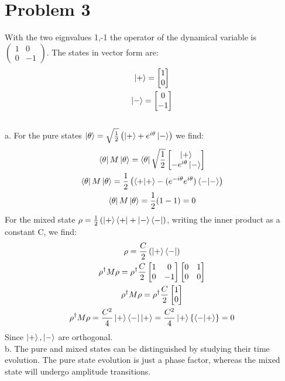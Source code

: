 \documentclass[a4paper,12pt]{article}
\numberwithin{equation}{section}
\begin{document}
\section{Problem 3}
With the two eignvalues 1,-1 the operator of the dynamical variable is $\left(\begin{smallmatrix}1&0\\0&-1\end{smallmatrix}\right)$.
The states in vector form are:
\begin{gather}
 \ket{+}=\begin{bmatrix}1\\0 \end{bmatrix}\\
 \ket{-}=\begin{bmatrix}0\\-1 \end{bmatrix}
\end{gather}
\\
a. For the pure states $\ket{\theta}=\sqrt{\frac{1}{2}}\left(\ket{+}+e^{i\theta}\ket{-}  \right)$ we find:
\begin{gather}
 \bra{\theta}M\ket{\theta}=\bra{\theta}\sqrt{\frac{1}{2}}\begin{bmatrix}\ket{+}\\-e^{i\theta}\ket{-} \end{bmatrix}\\
 \bra{\theta}M\ket{\theta}=\frac{1}{2}\left(\braket{+|+}-(e^{-i\theta}e^{i\theta})\braket{-|-}\right)\\
 \bra{\theta}M\ket{\theta}=\frac{1}{2}(1-1)=0
\end{gather}
For the mixed state $\rho=\frac{1}{2}\left(\ket{+}\braket{+|+|-}\bra{-}  \right)$, writing the inner product as a constant C, we find:
\begin{gather}
 \rho=\frac{C}{2}\left(\ket{+}\bra{-} \right)\\
 \rho^\dagger M \rho=\rho^\dagger \frac{C}{2} \begin{bmatrix}1&0\\0&-1\end{bmatrix} \begin{bmatrix}0&1\\0&0\end{bmatrix}\\
 \rho^\dagger M \rho=\rho^\dagger \frac{C}{2} \begin{bmatrix}1\\0\end{bmatrix}\\
 \rho^\dagger M \rho=\frac{C^2}{4}\ket{+}\bra{-}\ket{+}=\frac{C^2}{4}\ket{+}\left\{ \braket{-|+} \right\}=0
\end{gather}
Since $\ket{+},\ket{-}$ are orthogonal.\\
b. The pure and mixed states can be distinguished by studying their time evolution. 
The pure state evolution is just a phase factor, whereas the mixed state will undergo amplitude transitions.
\end{document}
